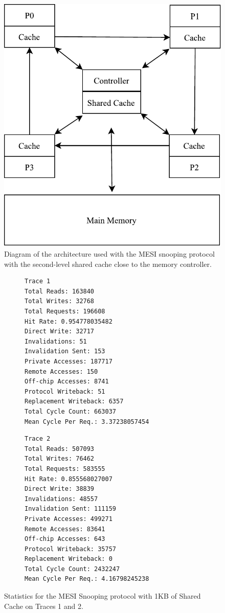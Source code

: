 \documentclass[12pt, a4paper, twoside]{article}
\begin{document}
\begin{figure}
\centering
\includegraphics{figs/MESISnooping2LevelCache.pdf}
\caption{Diagram of the architecture used with the MESI snooping protocol with
the second-level shared cache close to the memory controller.}
\label{fig:mesi-arch}
\end{figure}


\begin{figure}[h]
\centering
\begin{subfigure}{0.48\textwidth}
\begin{verbatim}
Trace 1
Total Reads: 163840
Total Writes: 32768
Total Requests: 196608
Hit Rate: 0.954778035482
Direct Write: 32717
Invalidations: 51
Invalidation Sent: 153
Private Accesses: 187717
Remote Accesses: 150
Off-chip Accesses: 8741
Protocol Writeback: 51
Replacement Writeback: 6357
Total Cycle Count: 663037
Mean Cycle Per Req.: 3.37238057454
\end{verbatim}
\end{subfigure}
\begin{subfigure}{0.48\textwidth}
\begin{verbatim}
Trace 2
Total Reads: 507093
Total Writes: 76462
Total Requests: 583555
Hit Rate: 0.855568027007
Direct Write: 38839
Invalidations: 48557
Invalidation Sent: 111159
Private Accesses: 499271
Remote Accesses: 83641
Off-chip Accesses: 643
Protocol Writeback: 35757
Replacement Writeback: 0
Total Cycle Count: 2432247
Mean Cycle Per Req.: 4.16798245238
\end{verbatim}
\end{subfigure}
\caption{Statistics for the MESI Snooping protocol with 1KB of Shared Cache on Traces 1 and 2.}
\end{figure}
\end{document}
